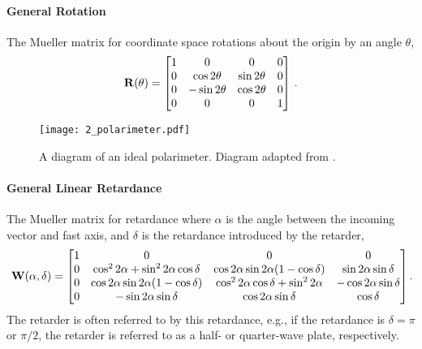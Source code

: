 \paragraph{General Rotation}
The Mueller matrix for coordinate space rotations about the origin by an angle $\theta$,
\begin{equation} \label{matrix:rotate}
    \mathbf{R}(\theta) =
    \begin{bmatrix}
        1 & 0              & 0             & 0 \\
        0 & \cos 2 \theta  & \sin 2 \theta & 0 \\
        0 & -\sin 2 \theta & \cos 2 \theta & 0 \\
        0 & 0              & 0             & 1 \\
    \end{bmatrix}\,.
\end{equation}

\begin{figure}[t]
    \centering
    \texttt{[image: 2\_polarimeter.pdf]}
    \caption{
        A diagram of an ideal polarimeter.
        Diagram adapted from \cite{pol_in_spectra}.
    }
    \label{fig:polarimeter}
\end{figure}

\paragraph{General Linear Retardance}
The Mueller matrix for retardance where $\alpha$ is the angle between the incoming vector and fast axis, and $\delta$ is the retardance introduced by the retarder,
\begin{equation} \label{matrix:retarder}
    \matr{W}(\alpha, \delta) =
    \begin{bmatrix}
        1 & 0                                                 & 0                                                 & 0                          \\
        0 & \cos^{2} 2 \alpha + \sin^{2} 2 \alpha \cos \delta & \cos 2 \alpha \sin 2 \alpha  (1 - \cos \delta)    & \sin 2 \alpha \sin \delta  \\
        0 & \cos 2 \alpha \sin 2 \alpha  (1 - \cos \delta)    & \cos^{2} 2 \alpha \cos \delta + \sin^{2} 2 \alpha & -\cos 2 \alpha \sin \delta \\
        0 & -\sin 2 \alpha \sin \delta                        & \cos 2 \alpha \sin \delta                         & \cos \delta                \\
    \end{bmatrix}\rlap{.} 
\end{equation}
The retarder is often referred to by this retardance, e.g., if the retardance is $\delta = \pi$ or $\pi / 2$, the retarder is referred to as a half- or quarter-wave plate, respectively.

